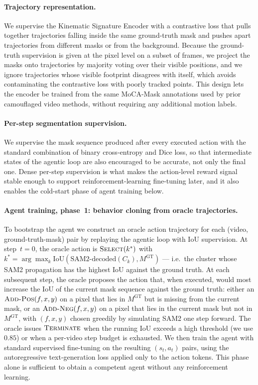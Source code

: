 \documentclass[11pt]{article}
\begin{document}
\paragraph{Trajectory representation.}
We supervise the Kinematic Signature Encoder with a contrastive loss that pulls together trajectories falling inside the same ground-truth mask and pushes apart trajectories from different masks or from the background.
Because the ground-truth supervision is given at the pixel level on a subset of frames, we project the masks onto trajectories by majority voting over their visible positions, and we ignore trajectories whose visible footprint disagrees with itself, which avoids contaminating the contrastive loss with poorly tracked points.
This design lets the encoder be trained from the same MoCA-Mask annotations used by prior camouflaged video methods, without requiring any additional motion labels.

\paragraph{Per-step segmentation supervision.}
We supervise the mask sequence produced after every executed action with the standard combination of binary cross-entropy and Dice loss, so that intermediate states of the agentic loop are also encouraged to be accurate, not only the final one.
Dense per-step supervision is what makes the action-level reward signal stable enough to support reinforcement-learning fine-tuning later, and it also enables the cold-start phase of agent training below.

\paragraph{Agent training, phase~1: behavior cloning from oracle trajectories.}
To bootstrap the agent we construct an oracle action trajectory for each (video, ground-truth-mask) pair by replaying the agentic loop with IoU supervision.
At step~$t=0$, the oracle action is $\textsc{Select}(k^*)$ with $k^*=\arg\max_k \mathrm{IoU}(\text{SAM2-decoded}(C_k), M^{\mathrm{GT}})$ --- i.e.\ the cluster whose SAM2 propagation has the highest IoU against the ground truth.
At each subsequent step, the oracle proposes the action that, when executed, would most increase the IoU of the current mask sequence against the ground truth: either an $\textsc{Add-Pos}(f,x,y)$ on a pixel that lies in $M^{\mathrm{GT}}$ but is missing from the current mask, or an $\textsc{Add-Neg}(f,x,y)$ on a pixel that lies in the current mask but not in $M^{\mathrm{GT}}$, with $(f,x,y)$ chosen greedily by simulating SAM2 one step forward.
The oracle issues $\textsc{Terminate}$ when the running IoU exceeds a high threshold (we use $0.85$) or when a per-video step budget is exhausted.
We then train the agent with standard supervised fine-tuning on the resulting $(s_t,a_t)$ pairs, using the autoregressive text-generation loss applied only to the action tokens.
This phase alone is sufficient to obtain a competent agent without any reinforcement learning.
\end{document}
